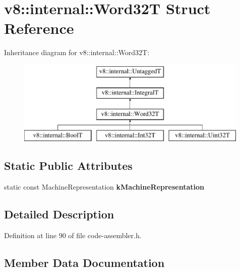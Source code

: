\hypertarget{structv8_1_1internal_1_1Word32T}{}\section{v8\+:\+:internal\+:\+:Word32T Struct Reference}
\label{structv8_1_1internal_1_1Word32T}
Inheritance diagram for v8\+:\+:internal\+:\+:Word32T\+:\begin{figure}[H]
\begin{center}
\leavevmode
\includegraphics[height=4.000000cm]{structv8_1_1internal_1_1Word32T}
\end{center}
\end{figure}
\subsection*{Static Public Attributes}
\begin{DoxyCompactItemize}
\item 
static const Machine\+Representation {\bfseries k\+Machine\+Representation}
\end{DoxyCompactItemize}


\subsection{Detailed Description}


Definition at line 90 of file code-\/assembler.\+h.



\subsection{Member Data Documentation}
\mbox{\label{structv8_1_1internal_1_1Word32T_ad0caf3b9421f940de8ad6476343e5289}} 
